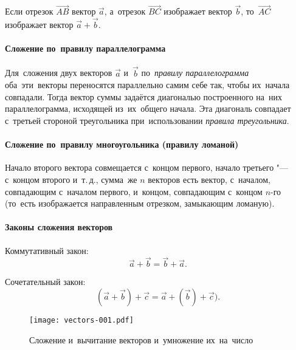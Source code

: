 \documentclass[]{scrartcl}
\begin{document}
Если отрезок ${\textstyle {\overrightarrow {AB}}}$ вектор ${\textstyle {\vec {a}}}$, а~отрезок ${\textstyle {\overrightarrow {BC}}}$ изображает вектор ${\displaystyle {\vec {b}}}$, то~$ {\textstyle {\overrightarrow {AC}}}$ изображает вектор ${\textstyle {\vec {a}}+{\vec {b}}}$.

\paragraph{Сложение по~правилу параллелограмма}

Для~сложения двух векторов ${\textstyle {\vec {a}}}$ и~${\textstyle {\vec {b}}}$ по~\emph{правилу параллелограмма} оба~эти~векторы переносятся параллельно самим себе так, чтобы их~начала совпадали. Тогда вектор суммы задаётся диагональю построенного на~них параллелограмма, исходящей из~их~общего начала. Эта диагональ совпадает с~третьей стороной треугольника при~использовании \emph{правила треугольника}.

\paragraph{Сложение по~правилу многоугольника (правилу ломаной)}
Начало второго вектора совмещается с~концом первого, начало третьего "--- с~концом второго и~т.\,д., сумма~же ${\textstyle n}$ векторов есть вектор, с~началом, совпадающим с~началом первого, и~концом, совпадающим с~концом ${\textstyle n}$-го (то~есть изображается направленным отрезком, замыкающим ломаную).
 
\paragraph{Законы сложения векторов}

Коммутативный закон:
\begin{equation}\label{eq:vec-sum-rule1}
\vec{a} + \vec{b} = \vec{b} + \vec{a}.
\end{equation} 

Сочетательный закон:
\begin{equation}\label{eq:vec-sum-rule2}
(\vec{a} + \vec{b}) + \vec{c} = \vec{a} + (\vec{b})+\vec{c}).
\end{equation} 

\begin{figure}[ht]
	\centering %
	\texttt{[image: vectors-001.pdf]}
	\caption{Сложение и~вычитание векторов и~умножение их~на~число}\label{fig:vec-sum-1}
\end{figure} 
\end{document}
